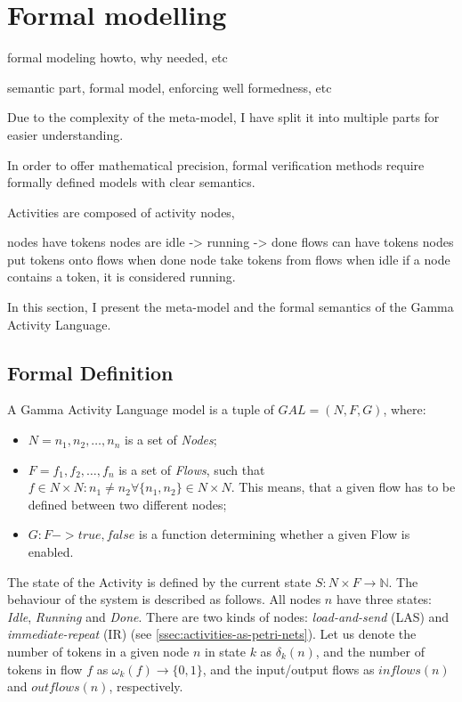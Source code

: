 \clearpage\section{Formal modelling}


formal modeling howto, why needed, etc

semantic part, formal model, enforcing well formedness, etc

Due to the complexity of the meta-model, I have split it into multiple parts for easier understanding.


In order to offer mathematical precision, formal verification methods require formally defined models with clear semantics. 

Activities are composed of activity nodes, 

nodes have tokens
nodes are idle -> running -> done
flows can have tokens
nodes put tokens onto flows when done
node take tokens from flows when idle
if a node contains a token, it is considered running.

In this section, I present the meta-model and the formal semantics of the Gamma Activity Language.

\subsection{Formal Definition}

\begin{definition}
	A Gamma Activity Language model is a tuple of \(GAL = (N, F, G)\), where:
	
	\begin{itemize}
		\item \(N = { n_1, n_2, \dots, n_n } \) is a set of \emph{Nodes};
		\item \(F = { f_1, f_2, \dots, f_n } \) is a set of \emph{Flows}, such that \(f \in N \times N : n_1 \neq n_2 \forall \{n_1, n_2\} \in N \times N\). This means, that a given flow has to be defined between two different nodes;
		\item \(G : F -> {true, false} \) is a function determining whether a given Flow is enabled.
	\end{itemize}
	
\end{definition}

The state of the Activity is defined by the current state \(S : N \times F \rightarrow \mathbb{N}\). The behaviour of the system is described as follows. All nodes \(n\) have three states: \emph{Idle}, \emph{Running} and \emph{Done}. There are two kinds of nodes: \emph{load-and-send} (LAS) and \emph{immediate-repeat} (IR) (see \autoref{ssec:activities-as-petri-nets}). Let us denote the number of tokens in a given node \(n\) in state \(k\) as \(\delta_k(n)\), and the number of tokens in flow \(f\) as \(\omega_k(f) \rightarrow \{0, 1\} \), and the input/output flows as \(inflows(n)\) and \(outflows(n)\), respectively.

